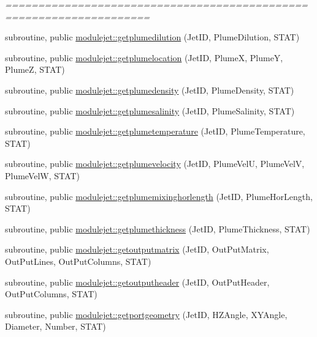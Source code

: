 \begin{DoxyCompactItemize}
\begin{DoxyCompactList}\small\item\em ==================================================================== \end{DoxyCompactList}\item 
subroutine, public \mbox{\hyperlink{namespacemodulejet_a5bd04e69691ddf86217eae82701cb7ea}{modulejet\+::getplumedilution}} (Jet\+ID, Plume\+Dilution, S\+T\+AT)
\item 
subroutine, public \mbox{\hyperlink{namespacemodulejet_a864a38eff68cbab56308586d389f202b}{modulejet\+::getplumelocation}} (Jet\+ID, PlumeX, PlumeY, PlumeZ, S\+T\+AT)
\item 
subroutine, public \mbox{\hyperlink{namespacemodulejet_aace5b51fdfea28b29ddf40d44b7805b4}{modulejet\+::getplumedensity}} (Jet\+ID, Plume\+Density, S\+T\+AT)
\item 
subroutine, public \mbox{\hyperlink{namespacemodulejet_a6a3b06a4b31a48d3feabf8b545a6e8b2}{modulejet\+::getplumesalinity}} (Jet\+ID, Plume\+Salinity, S\+T\+AT)
\item 
subroutine, public \mbox{\hyperlink{namespacemodulejet_aa64ddb0bd7c80f966b8ec54eb9a36c7c}{modulejet\+::getplumetemperature}} (Jet\+ID, Plume\+Temperature, S\+T\+AT)
\item 
subroutine, public \mbox{\hyperlink{namespacemodulejet_ab7e7ab36f584f4edd9e7f7835d1e0cee}{modulejet\+::getplumevelocity}} (Jet\+ID, Plume\+VelU, Plume\+VelV, Plume\+VelW, S\+T\+AT)
\item 
subroutine, public \mbox{\hyperlink{namespacemodulejet_a105341ffdec09f8266a68d6db9beba7f}{modulejet\+::getplumemixinghorlength}} (Jet\+ID, Plume\+Hor\+Length, S\+T\+AT)
\item 
subroutine, public \mbox{\hyperlink{namespacemodulejet_a50ced2ba527ab243cd3228d18867695d}{modulejet\+::getplumethickness}} (Jet\+ID, Plume\+Thickness, S\+T\+AT)
\item 
subroutine, public \mbox{\hyperlink{namespacemodulejet_a81ee4e71d54b53e9b3ab94bb817d66e8}{modulejet\+::getoutputmatrix}} (Jet\+ID, Out\+Put\+Matrix, Out\+Put\+Lines, Out\+Put\+Columns, S\+T\+AT)
\item 
subroutine, public \mbox{\hyperlink{namespacemodulejet_af33eb9ee692e4270d09338bd74aa8851}{modulejet\+::getoutputheader}} (Jet\+ID, Out\+Put\+Header, Out\+Put\+Columns, S\+T\+AT)
\item 
subroutine, public \mbox{\hyperlink{namespacemodulejet_adcc462c38759f6ba6caa1b8f33479fa8}{modulejet\+::getportgeometry}} (Jet\+ID, H\+Z\+Angle, X\+Y\+Angle, Diameter, Number, S\+T\+AT)

\end{DoxyCompactItemize}
